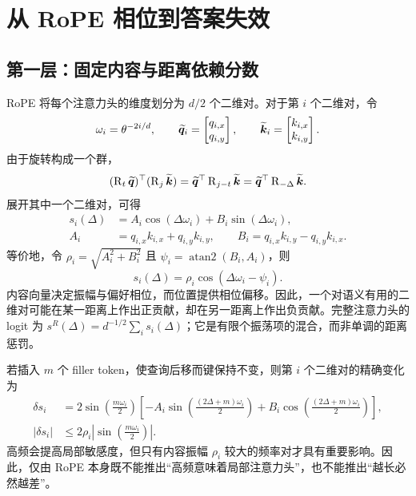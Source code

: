 \section{从 RoPE 相位到答案失效}
\label{sec:mechanism}

\subsection{第一层：固定内容与距离依赖分数}

RoPE 将每个注意力头的维度划分为 $d/2$ 个二维对。对于第 $i$ 个二维对，令
\begin{equation}
  \omega_i=\theta^{-2i/d},\qquad
  \widetilde{\bm q}_i=\begin{bmatrix}q_{i,x}\\q_{i,y}\end{bmatrix},\qquad
  \widetilde{\bm k}_i=\begin{bmatrix}k_{i,x}\\k_{i,y}\end{bmatrix}.
\end{equation}
由于旋转构成一个群，
\begin{equation}
  (\operatorname{R}_t\widetilde{\bm q})^{\top}(\operatorname{R}_j\widetilde{\bm k})
  =\widetilde{\bm q}^{\top}\operatorname{R}_{j-t}\widetilde{\bm k}
  =\widetilde{\bm q}^{\top}\operatorname{R}_{-\Delta}\widetilde{\bm k}.
  \label{eq:relative-rope}
\end{equation}
展开其中一个二维对，可得
\begin{align}
  s_i(\Delta)
  &=A_i\cos(\Delta\omega_i)+B_i\sin(\Delta\omega_i),
  \label{eq:pair-score}\\
  A_i&=q_{i,x}k_{i,x}+q_{i,y}k_{i,y},\qquad
  B_i=q_{i,x}k_{i,y}-q_{i,y}k_{i,x}.
\end{align}
等价地，令 $\rho_i=\sqrt{A_i^2+B_i^2}$ 且 $\psi_i=\operatorname{atan2}(B_i,A_i)$，则
\begin{equation}
  s_i(\Delta)=\rho_i\cos(\Delta\omega_i-\psi_i).
  \label{eq:amplitude-phase}
\end{equation}
内容向量决定振幅与偏好相位，而位置提供相位偏移。因此，一个对语义有用的二维对可能在某一距离上作出正贡献，却在另一距离上作出负贡献。完整注意力头的 logit 为 $s^R(\Delta)=d^{-1/2}\sum_i s_i(\Delta)$；它是有限个振荡项的混合，而非单调的距离惩罚。

若插入 $m$ 个 filler token，使查询后移而键保持不变，则第 $i$ 个二维对的精确变化为
\begin{align}
  \delta s_i
  &=2\sin\!\left(\frac{m\omega_i}{2}\right)
  \left[
  -A_i\sin\!\left(\frac{(2\Delta+m)\omega_i}{2}\right)
  +B_i\cos\!\left(\frac{(2\Delta+m)\omega_i}{2}\right)
  \right],
  \label{eq:pair-delta}\\
  |\delta s_i|
  &\le 2\rho_i\left|\sin\!\left(\frac{m\omega_i}{2}\right)\right|.
  \label{eq:pair-bound}
\end{align}
高频会提高局部敏感度，但只有内容振幅 $\rho_i$ 较大的频率对才具有重要影响。因此，仅由 RoPE 本身既不能推出“高频意味着局部注意力头”，也不能推出“越长必然越差”。

